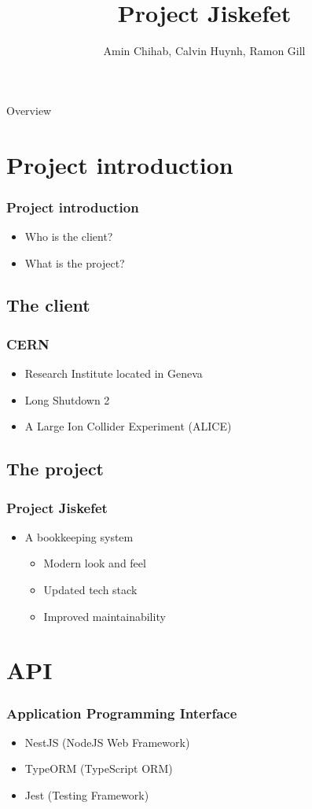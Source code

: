 \documentclass[12pt]{beamer}
\title{Project Jiskefet}
\date{\displaydate{date}}
\author{Amin Chihab, Calvin Huynh, Ramon Gill}
\begin{document}
	\begin{frame}
	\titlepage
	\end{frame}

	\begin{frame}{Overview}
		\tableofcontents
	\end{frame}
	
	\section{Project introduction}
	\begin{frame}
	    \frametitle{Project introduction}
		\begin{itemize}
			\item Who is the client?
			\item What is the project?
		\end{itemize}
    \end{frame}

	\subsection{The client}
	\begin{frame}
		\frametitle{CERN}
		\begin{itemize}
			 \item Research Institute located in Geneva
			 \item Long Shutdown 2
			 \item A Large Ion Collider Experiment (ALICE)
		\end{itemize}
	\end{frame}

	\subsection{The project}
	\begin{frame}
		\frametitle{Project Jiskefet}
		\begin{itemize}
			\item A bookkeeping system
			\begin{itemize}
				\item Modern look and feel
				\item Updated tech stack
				\item Improved maintainability
			\end{itemize}
	   \end{itemize}
	\end{frame}

	\section{API}
    \begin{frame}
        \frametitle{Application Programming Interface}
        \begin{itemize}
        	\item NestJS (NodeJS Web Framework)
			\item TypeORM (TypeScript ORM)
			\item Jest (Testing Framework)
        \end{itemize}
    \end{frame}
\end{document}
